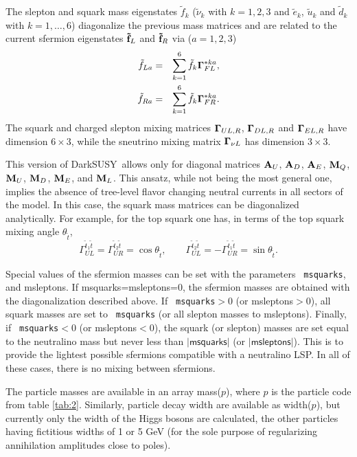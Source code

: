\documentclass[a4paper,10pt,oneside]{book}
\newcommand{\ds}{{\sffamily DarkSUSY}}
\newcommand{\ft}[1]{\textsf{#1}}
\begin{document}
The slepton and squark mass eigenstates $\tilde{f}_k$ ($\tilde{\nu}_k$
with $k=1,2,3$ and $\tilde{e}_k$, $\tilde{u}_k$ and $\tilde{d}_k$ with
$k=1,\dots,6$) diagonalize the previous mass matrices and are related
to the current sfermion eigenstates ${\bf \tilde{f}}_{L}$ and ${\bf
\tilde{f}}_{R}$ via ($a=1,2,3$)
\begin{eqnarray}
  \tilde{f}_{La} & = & \sum_{k=1}^6 \tilde{f}_k {\bf \Gamma}_{FL}^{*ka} , \\
  \tilde{f}_{Ra} & = & \sum_{k=1}^6 \tilde{f}_k {\bf \Gamma}_{FR}^{*ka} .
\end{eqnarray} 
The squark and charged slepton mixing matrices ${\bf \Gamma}_{UL,R}$,
${\bf \Gamma}_{DL,R}$ and ${\bf \Gamma}_{EL,R}$ have dimension
$6\times 3$, while the sneutrino mixing matrix ${\bf \Gamma}_{\nu L}$
has dimension $3\times3$.

This version of \ds\ allows only for diagonal matrices ${\bf A}_U$,
${\bf A}_D$, ${\bf A}_E$, ${\bf M}_Q$, ${\bf M}_U$, ${\bf M}_D$, ${\bf M}_E$,
and ${\bf M}_L$. This ansatz, while not being the most general one, implies the
absence of tree-level flavor changing neutral currents in all sectors of the
model. In this case, the squark mass matrices can be diagonalized analytically.
For example, for the top squark one has, in terms of the top squark mixing
angle $\theta_{\tilde{t}}$,
\begin{equation}
  \Gamma_{UL}^{\tilde{t}_1\tilde{t}} =
  \Gamma_{UR}^{\tilde{t}_2\tilde{t}} = \cos \theta_{\tilde{t}} ,
  \qquad
  \Gamma_{UL}^{\tilde{t}_2\tilde{t}} =
  - \Gamma_{UR}^{\tilde{t}_1\tilde{t}} = \sin \theta_{\tilde{t}} .
\end{equation}

Special values of the sfermion masses can be set with the parameters {\tt
  msquarks}, and \ft{msleptons}.  If \ft{msquarks}=\ft{msleptons}=0, the
sfermion masses are obtained with the diagonalization described above. If {\tt
  msquarks}$>$0 (or \ft{msleptons}$>$0), all squark masses are set to {\tt
  msquarks} (or all slepton masses to \ft{msleptons}).  Finally, if {\tt
  msquarks}$<$0 (or \ft{msleptons}$<$0), the squark (or slepton) masses are
set equal to the neutralino mass but never less than $|\ft{msquarks}|$ (or
$|\ft{msleptons}|$).  This is to provide the lightest possible sfermions
compatible with a neutralino LSP. In all of these cases, there is no mixing
  between sfermions.


The particle masses are available in an array \ft{mass($p$)}, where $p$ is the
particle code from table \ref{tab:2}. Similarly, particle decay width are
available as \ft{width($p$)}, but currently only the width of the Higgs bosons
are calculated, the other particles having fictitious widths of 1 or 5 GeV (for
the sole purpose of regularizing annihilation amplitudes close to poles).
\end{document}
